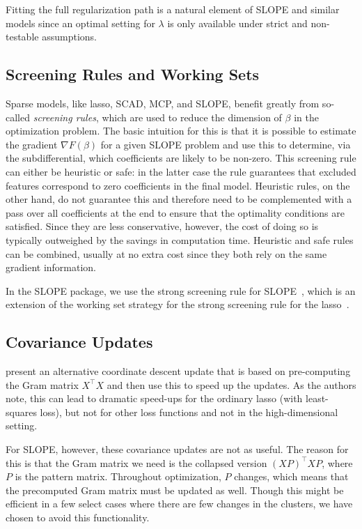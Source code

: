 \documentclass[article]{jss}
\begin{document}
Fitting the full regularization path is a natural element of SLOPE and similar
models since an optimal setting for \(\lambda\) is only available under
strict and non-testable assumptions.

\subsection{Screening Rules and Working Sets}

Sparse models, like lasso, SCAD, MCP, and SLOPE, benefit greatly from
so-called \emph{screening rules}, which are used to reduce the dimension of
\(\beta\) in the optimization problem. The basic intuition for this is that
it is possible to estimate the gradient \(\nabla F(\beta) \) for a given SLOPE problem
and use this to determine, via the subdifferential, which coefficients are
likely to be non-zero. This screening rule can either be heuristic or safe:
in the latter case the rule guarantees that excluded features correspond
to zero coefficients in the final model. Heuristic rules, on the other hand,
do not guarantee this and therefore need to be complemented with a pass
over all coefficients at the end to ensure that the optimality conditions
are satisfied. Since they are less conservative, however, the cost of
doing so is typically outweighed by the savings in computation time.
Heuristic and safe rules can be combined, usually at no extra cost since
they both rely on the same gradient information.

In the SLOPE package, we use the strong screening rule for
SLOPE~\citep{larsson2020a}, which is an extension of the working set strategy
for the strong screening rule for the lasso~\citep{tibshirani2012}.

\subsection{Covariance Updates}

\citet{friedman2010} present an alternative coordinate descent update that is
based on pre-computing the Gram matrix \(X^\intercal X\) and then use this to
speed up the updates. As the authors note, this can lead to dramatic speed-ups
for the ordinary lasso (with least-squares loss), but not for other loss
functions and not in the high-dimensional setting.

For SLOPE, however, these covariance updates are not as useful. The
reason for this is that the Gram matrix we need is the collapsed
version \((XP)^\intercal XP\), where \(P\) is the pattern matrix.
Throughout optimization, \(P\) changes, which means that the
precomputed Gram matrix must be updated as well. Though this
might be efficient in a few select cases where there are few
changes in the clusters, we have chosen to avoid this
functionality.
\end{document}
